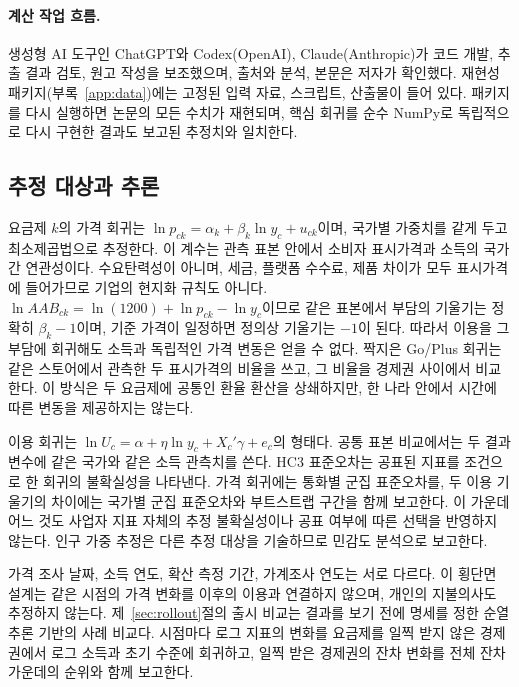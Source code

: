 \documentclass[11pt]{article}
\theoremstyle{definition}
\theoremstyle{remark}
\newcommand{\AAB}{\mathit{AAB}}
\begin{document}
\paragraph{계산 작업 흐름.} 생성형 AI 도구인 ChatGPT와 Codex(OpenAI), Claude(Anthropic)가 코드 개발, 추출 결과 검토, 원고 작성을 보조했으며, 출처와 분석, 본문은 저자가 확인했다. 재현성 패키지(부록~\ref{app:data})에는 고정된 입력 자료, 스크립트, 산출물이 들어 있다. 패키지를 다시 실행하면 논문의 모든 수치가 재현되며, 핵심 회귀를 순수 NumPy로 독립적으로 다시 구현한 결과도 보고된 추정치와 일치한다.

\subsection{추정 대상과 추론}

요금제 $k$의 가격 회귀는 $\ln p_{ck}=\alpha_k+\beta_k\ln y_c+u_{ck}$이며, 국가별 가중치를 같게 두고 최소제곱법으로 추정한다. 이 계수는 관측 표본 안에서 소비자 표시가격과 소득의 국가 간 연관성이다. 수요탄력성이 아니며, 세금, 플랫폼 수수료, 제품 차이가 모두 표시가격에 들어가므로 기업의 현지화 규칙도 아니다. $\ln\AAB_{ck}=\ln(1200)+\ln p_{ck}-\ln y_c$이므로 같은 표본에서 부담의 기울기는 정확히 $\beta_k-1$이며, 기준 가격이 일정하면 정의상 기울기는 $-1$이 된다. 따라서 이용을 그 부담에 회귀해도 소득과 독립적인 가격 변동은 얻을 수 없다. 짝지은 Go/Plus 회귀는 같은 스토어에서 관측한 두 표시가격의 비율을 쓰고, 그 비율을 경제권 사이에서 비교한다. 이 방식은 두 요금제에 공통인 환율 환산을 상쇄하지만, 한 나라 안에서 시간에 따른 변동을 제공하지는 않는다.

이용 회귀는 $\ln U_c=\alpha+\eta\ln y_c+X_c'\gamma+e_c$의 형태다. 공통 표본 비교에서는 두 결과 변수에 같은 국가와 같은 소득 관측치를 쓴다. HC3 표준오차는 공표된 지표를 조건으로 한 회귀의 불확실성을 나타낸다. 가격 회귀에는 통화별 군집 표준오차를, 두 이용 기울기의 차이에는 국가별 군집 표준오차와 부트스트랩 구간을 함께 보고한다. 이 가운데 어느 것도 사업자 지표 자체의 추정 불확실성이나 공표 여부에 따른 선택을 반영하지 않는다. 인구 가중 추정은 다른 추정 대상을 기술하므로 민감도 분석으로 보고한다.

가격 조사 날짜, 소득 연도, 확산 측정 기간, 가계조사 연도는 서로 다르다. 이 횡단면 설계는 같은 시점의 가격 변화를 이후의 이용과 연결하지 않으며, 개인의 지불의사도 추정하지 않는다. 제~\ref{sec:rollout}절의 출시 비교는 결과를 보기 전에 명세를 정한 순열 추론 기반의 사례 비교다. 시점마다 로그 지표의 변화를 요금제를 일찍 받지 않은 경제권에서 로그 소득과 초기 수준에 회귀하고, 일찍 받은 경제권의 잔차 변화를 전체 잔차 가운데의 순위와 함께 보고한다.
\end{document}
